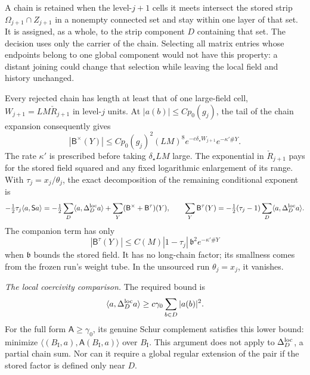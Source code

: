 \documentclass[11pt,letterpaper,reqno]{amsart}
\theoremstyle{definition}
\theoremstyle{remark}
\begin{document}
A chain is retained when the level-\(j+1\) cells it
meets intersect the stored strip
\(\Omega_{j+1}\cap Z_{j+1}\) in a nonempty connected
set and stay within one layer of that set.
It is assigned, as a whole, to the strip component
\(D\) containing that set. The decision uses only
the carrier of the chain. Selecting all matrix
entries whose endpoints belong to one global
component would not have this property: a distant
joining could change that selection while leaving
the local field and history unchanged.

Every rejected chain has length at least that of
one large-field cell,
\(W_{j+1}=LM\check R_{j+1}\) in level-\(j\) units.
At \(|a(b)|\le Cp_0(g_j)\), the tail of the chain
expansion consequently gives
\begin{equation}\label{eq:kept-rejected-chains}
 |\mathsf B^\times(Y)|
 \le Cp_0(g_j)^2(LM)^8
       e^{-c\delta_\star W_{j+1}}e^{-\kappa'\#Y}.
\end{equation}
The rate \(\kappa'\) is prescribed before taking
\(\delta_\star LM\) large. The exponential in
\(\check R_{j+1}\) pays for the stored field squared
and any fixed logarithmic enlargement of its range.
With \(\tau_j=x_j/\theta_j\), the exact decomposition
of the remaining conditional exponent is
\[
 -\tfrac12\tau_j\langle a,\mathsf Sa\rangle
 =-\tfrac12\sum_D\langle a,\Delta_D^{\rm loc}a\rangle
                         +\sum_Y(\mathsf B^\times+\mathsf B^\tau)(Y),
 \qquad
 \sum_Y\mathsf B^\tau(Y)
       =-\tfrac12(\tau_j-1)
                          \sum_D\langle a,\Delta_D^{\rm loc}a\rangle .
\]
The companion term has only
\[
 |\mathsf B^\tau(Y)|
       \le C(M)|1-\tau_j|\,\mathfrak b^2e^{-\kappa'\#Y}
\]
when \(\mathfrak b\) bounds the stored field.
It has no long-chain factor; its smallness comes
from the frozen run's weight tube. In the unsourced
run \(\theta_j=x_j\), it vanishes.

\emph{The local coercivity comparison.}
The required bound is
\begin{equation}\label{eq:kept-coercivity}
 \langle a,\Delta_D^{\rm loc}a\rangle
                  \ge c\gamma_0\sum_{b\in D}|a(b)|^2.
\end{equation}
For the full form \(\mathsf A\ge\gamma_0\), its
genuine Schur complement satisfies this lower bound:
minimize \(\langle(B_{\mathrm I},a),
\mathsf A(B_{\mathrm I},a)\rangle\) over \(B_{\mathrm I}\).
This argument does not apply to
\(\Delta_D^{\rm loc}\), a partial chain sum.
Nor can it require a global regular extension
of the pair if the stored factor is defined only
near \(D\).
\end{document}
